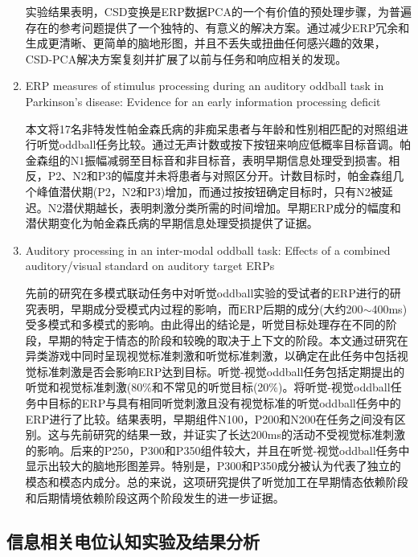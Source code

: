 \documentclass{hitreport}
\begin{document}
\begin{enumerate}
\hspace{2em}实验结果表明，CSD变换是ERP数据PCA的一个有价值的预处理步骤，为普遍存在的参考问题提供了一个独特的、有意义的解决方案。通过减少ERP冗余和生成更清晰、更简单的脑地形图，并且不丢失或扭曲任何感兴趣的效果，CSD-PCA解决方案复刻并扩展了以前与任务和响应相关的发现。

\item ERP measures of stimulus processing during an auditory oddball task in Parkinson's disease: Evidence for an early information processing deficit\cite{Wright1996}

\hspace{2em}本文将17名非特发性帕金森氏病的非痴呆患者与年龄和性别相匹配的对照组进行听觉oddball任务比较。通过无声计数或按下按钮来响应低概率目标音调。帕金森组的N1振幅减弱至目标音和非目标音，表明早期信息处理受到损害。相反，P2、N2和P3的幅度并未将患者与对照区分开。计数目标时，帕金森组几个峰值潜伏期(P2，N2和P3)增加，而通过按按钮确定目标时，只有N2被延迟。N2潜伏期越长，表明刺激分类所需的时间增加。早期ERP成分的幅度和潜伏期变化为帕金森氏病的早期信息处理受损提供了证据。

\item Auditory processing in an inter-modal oddball task: Effects of a combined auditory/visual standard on auditory target ERPs\cite{Brown2007}

\hspace{2em}先前的研究在多模式联动任务中对听觉oddball实验的受试者的ERP进行的研究表明，早期成分受模式内过程的影响，而ERP后期的成分(大约200$\sim$400ms)受多模式和多模式的影响。由此得出的结论是，听觉目标处理存在不同的阶段，早期的特定于情态的阶段和较晚的取决于上下文的阶段。本文通过研究在异类游戏中同时呈现视觉标准刺激和听觉标准刺激，以确定在此任务中包括视觉标准刺激是否会影响ERP达到目标。听觉-视觉oddball任务包括定期提出的听觉和视觉标准刺激(80\%和不常见的听觉目标(20\%)。将听觉-视觉oddball任务中目标的ERP与具有相同听觉刺激且没有视觉标准的听觉oddball任务中的ERP进行了比较。结果表明，早期组件N100，P200和N200在任务之间没有区别。这与先前研究的结果一致，并证实了长达200ms的活动不受视觉标准刺激的影响。后来的P250，P300和P350组件较大，并且在听觉-视觉oddball任务中显示出较大的脑地形图差异。特别是，P300和P350成分被认为代表了独立的模态和模态内成分。总的来说，这项研究提供了听觉加工在早期情态依赖阶段和后期情境依赖阶段这两个阶段发生的进一步证据。


\end{enumerate}


\subsection{信息相关电位认知实验及结果分析}
\end{document}
